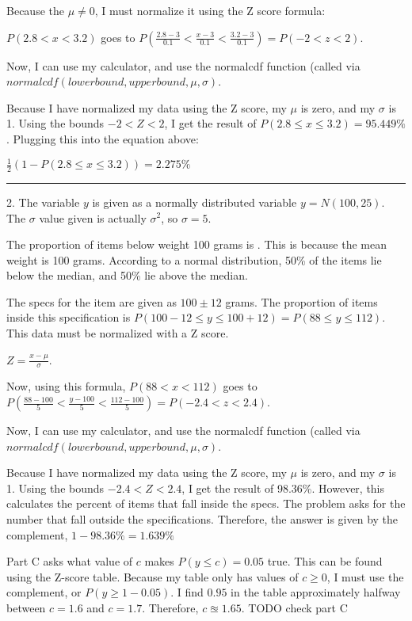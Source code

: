 \documentclass{article}
\begin{document}
Because the $\mu \neq 0$, I must normalize it using the Z score formula:

 $P(2.8 < x < 3.2)$ goes to $P(\frac{2.8-3}{0.1} < \frac{x-3}{0.1} < \frac{3.2-3}{0.1})=P(-2 < z < 2)$. 
 
 Now, I can use my calculator, and use the normalcdf function (called via $normalcdf(lowerbound,upperbound,\mu,\sigma)$. 
 
 Because I have normalized my data using the Z score, my $\mu$ is zero, and my $\sigma$ is 1. Using the bounds $-2<Z<2$, I get the result of $P(2.8 \leq x \leq 3.2) = 95.449\%$. Plugging this into the equation above:
 
 $\frac{1}{2}(1 - P(2.8 \leq x \leq 3.2) ) = \boxed{2.275\%}$
 

\noindent\rule{8cm}{0.4pt}

2. The variable $y$ is given as a normally distributed variable $y = N(100, 25)$. The $\sigma$ value given is actually $\sigma^2$, so $\sigma=5$.  

The proportion of items below weight 100 grams is . This is because the mean weight is 100 grams. According to a normal distribution, 50\% of the items lie below the median, and 50\% lie above the median. 

The specs for the item are given as $100 \pm 12$ grams. The proportion of items inside this specification is $P(100-12 \leq y \leq 100+12) = P(88 \leq y \leq 112)$. This data must be normalized with a Z score. 

$Z = \frac{x-\mu}{\sigma}$.

Now, using this formula, $P(88 < x < 112)$ goes to $P(\frac{88-100}{5} < \frac{y-100}{5} < \frac{112-100}{5})=P(-2.4 < z < 2.4)$. 

Now, I can use my calculator, and use the normalcdf function (called via $normalcdf(lowerbound,upperbound,\mu,\sigma)$. 

Because I have normalized my data using the Z score, my $\mu$ is zero, and my $\sigma$ is 1. Using the bounds $-2.4<Z<2.4$, I get the result of 98.36\%. However, this calculates the percent of items that fall inside the specs. The problem asks for the number that fall outside the specifications. Therefore, the answer is given by the complement, $1 - 98.36\% = \boxed{1.639\%}$


Part C asks what value of $c$ makes $P(y\leq c) = 0.05$ true. This can be found using the Z-score table. Because my table only has values of $c\geq0$, I must use the complement, or $P(y \geq 1-0.05)$. I find $0.95$ in the table approximately halfway between $c = 1.6$ and $c = 1.7$. Therefore, $\boxed{c \approxeq 1.65}$. 
TODO check part C
\end{document}
